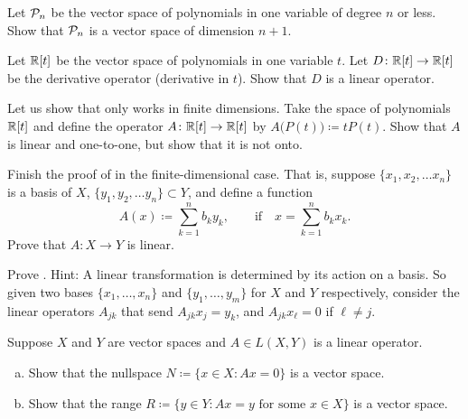 \begin{exercise}
Let ${\mathcal{P}}_n$ be the vector space of polynomials in one variable of degree $n$
or less.  Show that ${\mathcal{P}}_n$ is a vector space of dimension $n+1$.
\end{exercise}

\begin{exercise}
Let ${\mathbb{R}}[t]$ be the vector space of polynomials in one variable $t$.  Let
$D \colon {\mathbb{R}}[t] \to {\mathbb{R}}[t]$ be the derivative operator (derivative in $t$).
Show that $D$ is a linear operator.
\end{exercise}

\begin{exercise}
Let us show that  only works in finite
dimensions.  Take the space of polynomials ${\mathbb{R}}[t]$ and define the operator $A \colon {\mathbb{R}}[t] \to {\mathbb{R}}[t]$
by $A\bigl(P(t)\bigr) \coloneqq tP(t)$.  Show that $A$ is linear and one-to-one, but
show that it is not onto.
\end{exercise}

\begin{exercise}
Finish the proof of  in the finite-dimensional case.
That is, suppose
$\{ x_1, x_2,\ldots x_n \}$ is a basis of $X$,
$\{ y_1, y_2,\ldots y_n \} \subset Y$, and define a
function
\begin{equation*}
A(x) \coloneqq \sum_{k=1}^n b_k y_k, \qquad \text{if} \quad x=\sum_{k=1}^n b_k x_k .
\end{equation*}
Prove that $A \colon X \to Y$ is linear.
\end{exercise}


\begin{exercise}
Prove .  Hint: A linear transformation is determined by
its action on a basis.  So given two bases
$\{ x_1,\ldots,x_n \}$ and
$\{ y_1,\ldots,y_m \}$ for $X$ and $Y$ respectively, consider the linear
operators $A_{jk}$ that send $A_{jk} x_j = y_k$, and 
$A_{jk} x_\ell = 0$ if $\ell \not= j$.
\end{exercise}

\begin{samepage}
\begin{exercise}[Easy]
Suppose $X$ and $Y$ are vector spaces and $A \in L(X,Y)$ is a linear
operator.
\begin{enumerate}[a)]
\item
Show that the nullspace $N \coloneqq \{ x \in X : Ax = 0 \}$ is a
vector space.
\item
Show that the range $R \coloneqq \{ y \in Y : Ax = y \text{ for some } x \in X \}$ is a
vector space.
\end{enumerate}
\end{exercise}
\end{samepage}


